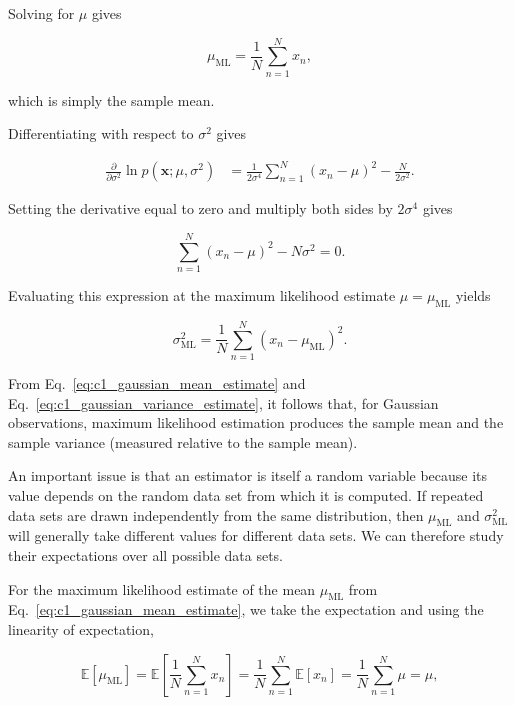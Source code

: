 \documentclass[10pt,twocolumn]{memoir}
\begin{document}
Solving for $\mu$ gives

\begin{equation}
    \mu_{\mathrm{ML}} = \frac{1}{N}\sum_{n=1}^{N}x_n,
\label{eq:c1_gaussian_mean_estimate}
\end{equation}

which is simply the sample mean.

Differentiating with respect to $\sigma^2$ gives

\begin{align}
    \frac{\partial}{\partial \sigma^2} \ln p(\mathbf{x};\mu,\sigma^2)
    &=
    \frac{1}{2\sigma^4} \sum_{n=1}^{N}(x_n-\mu)^2 - \frac{N}{2\sigma^2}.
\end{align}

Setting the derivative equal to zero and multiply both sides by $2\sigma^4$ gives

\begin{equation}
    \sum_{n=1}^{N}(x_n-\mu)^2 - N\sigma^2 = 0.
\end{equation}

Evaluating this expression at the maximum likelihood estimate $\mu=\mu_{\mathrm{ML}}$ yields

\begin{equation}
    \sigma_{\mathrm{ML}}^2 = \frac{1}{N}\sum_{n=1}^{N}(x_n-\mu_{\mathrm{ML}})^2.
\label{eq:c1_gaussian_variance_estimate}
\end{equation}

From Eq.~\ref{eq:c1_gaussian_mean_estimate} and Eq.~\ref{eq:c1_gaussian_variance_estimate}, it follows that, for Gaussian observations, maximum likelihood estimation produces the sample mean and the sample variance (measured relative to the sample mean).

An important issue is that an estimator is itself a random variable because its value depends on the random data set from which it is computed. If repeated data sets are drawn independently from the same distribution,
then $\mu_{\mathrm{ML}}$ and $\sigma_{\mathrm{ML}}^2$ will generally take different values for different data sets. We can therefore study their expectations over all possible data sets.

For the maximum likelihood estimate of the mean $\mu_\mathrm{ML}$ from Eq.~\ref{eq:c1_gaussian_mean_estimate}, we take the expectation and using the linearity of expectation,

\begin{equation}
    \mathbb{E}[\mu_{\mathrm{ML}}]
    = \mathbb{E}\left[\frac{1}{N}\sum_{n=1}^{N}x_n\right]
    = \frac{1}{N}\sum_{n=1}^{N}\mathbb{E}[x_n]
    = \frac{1}{N}\sum_{n=1}^{N}\mu = \mu,
\label{eq:c1_maximum_likelihood_mean}
\end{equation}
\end{document}
